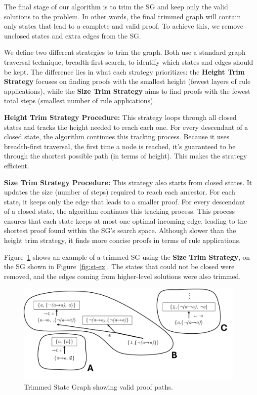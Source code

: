 \documentclass[runningheads]{llncs}
\begin{document}
The final stage of our algorithm is to trim the SG and keep only the valid solutions to the problem. In other words, the final trimmed graph will contain only states that lead to a complete and valid proof. To achieve this, we remove unclosed states and extra edges from the SG.

We define two different strategies to trim the graph. Both use a standard graph traversal technique, breadth-first search, to identify which states and edges should be kept. The difference lies in what each strategy prioritizes: the \textbf{Height Trim Strategy} focuses on finding proofs with the smallest height (fewest layers of rule applications), while the \textbf{Size Trim Strategy} aims to find proofs with the fewest total steps (smallest number of rule applications).


\vspace{1em}
\textbf{Height Trim Strategy Procedure:}  
This strategy loops through all closed states and tracks the height needed to reach each one. For every descendant of a closed state, the algorithm continues this tracking process. Because it uses breadth-first traversal, the first time a node is reached, it’s guaranteed to be through the shortest possible path (in terms of height). This makes the strategy efficient.

\vspace{0.5em}
\textbf{Size Trim Strategy Procedure:}  
This strategy also starts from closed states. It updates the size (number of steps) required to reach each ancestor. For each state, it keeps only the edge that leads to a smaller proof. For every descendant
of a closed state, the algorithm continues this tracking process. This process ensures that each state keeps at most one optimal incoming edge, leading to the shortest proof found within the SG's search space. Although slower than the height trim strategy, it finds more concise proofs in terms of rule applications.

\vspace{1em}
Figure~\ref{fig:sg-trim} shows an example of a trimmed SG using the \textbf{Size Trim Strategy}, on the SG shown in Figure~\ref{fig:st-ex}. The states that could not be closed were removed, and the edges coming from higher-level solutions were also trimmed.

\begin{figure}
    \centering
    \includegraphics[width=1\linewidth]{resources/sg-final.jpg}
    \caption{Trimmed State Graph showing valid proof paths.}
    \label{fig:sg-trim}
\end{figure}
\end{document}
